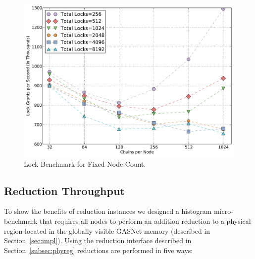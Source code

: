 \begin{figure}
\begin{center}
\includegraphics[scale=0.33]{figs/fixed_node_lock.pdf}
\end{center}
\vspace{-2mm}
\caption{Lock Benchmark for Fixed Node Count.\label{fig:fixednode}}
\vspace{-4mm}
\end{figure}


\subsection{Reduction Throughput}
\label{subsec:reducmicro}
To show the benefits of reduction instances we designed
a histogram micro-benchmark that requires all nodes to perform an addition reduction to a
physical region located in the globally visible GASNet memory (described in 
Section~\ref{sec:impl}).  Using the reduction interface described in Section~\ref{subsec:phyreg}
reductions are performed in five ways:

